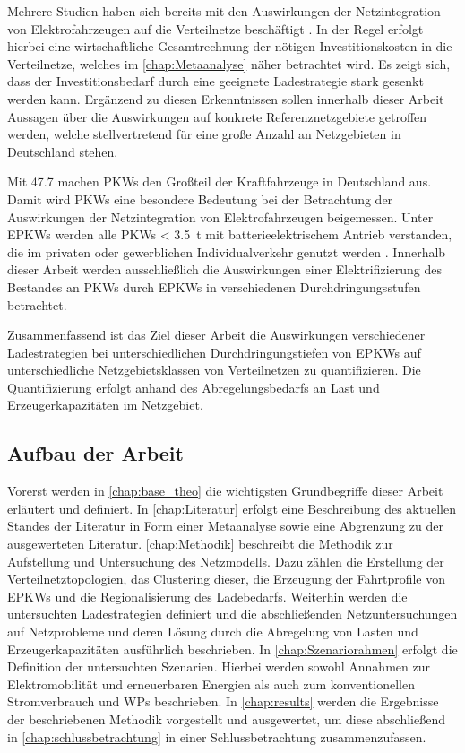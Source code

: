 Mehrere Studien haben sich bereits mit den Auswirkungen der Netzintegration von Elektrofahrzeugen auf die Verteilnetze beschäftigt \cite{Agora2019} \cite{DEAGH2018} \cite{BCG2018}.
In der Regel erfolgt hierbei eine wirtschaftliche Gesamtrechnung der nötigen Investitionskosten in die Verteilnetze, welches im \autoref{chap:Metaanalyse} näher betrachtet wird.
Es zeigt sich, dass der Investitionsbedarf durch eine geeignete Ladestrategie stark gesenkt werden kann.
Ergänzend zu diesen Erkenntnissen sollen innerhalb dieser Arbeit Aussagen über die Auswirkungen auf konkrete Referenznetzgebiete getroffen werden, welche stellvertretend für eine große Anzahl an Netzgebieten in Deutschland stehen.\medskip

Mit \SI{47.7}{\MioFZs} \cite{KBA2020a} machen \glspl{PKW} den Großteil der Kraftfahrzeuge in Deutschland aus.
Damit wird \glspl{PKW} eine besondere Bedeutung bei der Betrachtung der Auswirkungen der Netzintegration von Elektrofahrzeugen beigemessen.
Unter \glspl{EPKW} werden alle \glspl{PKW} \SI{< 3.5}{\tonne} mit batterieelektrischem Antrieb verstanden, die im privaten oder gewerblichen Individualverkehr genutzt werden \cite{BNetzA2020}.
Innerhalb dieser Arbeit werden ausschließlich die Auswirkungen einer Elektrifizierung des Bestandes an \glspl{PKW} durch \glspl{EPKW} in verschiedenen Durchdringungsstufen betrachtet.\medskip

Zusammenfassend ist das Ziel dieser Arbeit die Auswirkungen verschiedener Lade\-strategien bei unterschiedlichen Durchdringungstiefen von \glspl{EPKW} auf unterschiedliche Netzgebietsklassen von Verteilnetzen zu quantifizieren.
Die Quantifizierung erfolgt anhand des Abregelungsbedarfs an Last und Erzeugerkapazitäten im Netzgebiet.


\subsection{Aufbau der Arbeit}

Vorerst werden in \autoref{chap:base_theo} die wichtigsten Grundbegriffe dieser Arbeit erläutert und definiert.
In \autoref{chap:Literatur} erfolgt eine Beschreibung des aktuellen Standes der Literatur in Form einer Metaanalyse sowie eine Abgrenzung zu der ausgewerteten Literatur.
\autoref{chap:Methodik} beschreibt die Methodik zur Aufstellung und Untersuchung des Netzmodells.
Dazu zählen die Erstellung der Verteilnetztopologien, das Clustering dieser, die Erzeugung der Fahrtprofile von \glspl{EPKW} und die Regionalisierung des Ladebedarfs.
Weiterhin werden die untersuchten Ladestrategien definiert und die abschließenden Netzuntersuchungen auf Netzprobleme und deren Lösung durch die Abregelung von Lasten und Erzeugerkapazitäten ausführlich beschrieben.
In \autoref{chap:Szenariorahmen} erfolgt die Definition der untersuchten Szenarien.
Hierbei werden sowohl Annahmen zur Elektromobilität und erneuerbaren Energien als auch zum konventionellen Stromverbrauch und \glspl{WP} beschrieben.
In \autoref{chap:results} werden die Ergebnisse der beschriebenen Methodik vorgestellt und ausgewertet, um diese abschließend in \autoref{chap:schlussbetrachtung} in einer Schlussbetrachtung zusammenzufassen.

\clearpage

